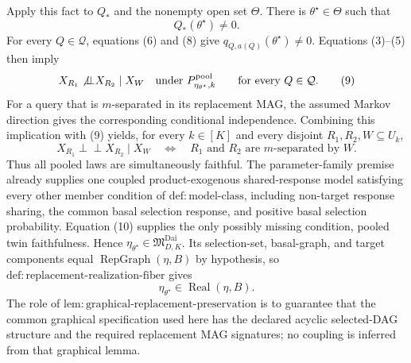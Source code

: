 Apply this fact to \(Q_*\) and the nonempty open set \(\Theta\). There is \(\theta^\star\in\Theta\) such that
\[
 Q_*(\theta^\star)\ne0.
 \tag{8}
\]
For every \(Q\in\mathcal Q\), equations (6) and (8) give \(q_{Q,a(Q)}(\theta^\star)\ne0\). Equations (3)--(5) then imply
\[
 X_{R_1}\not\!\mathbin{\perp\!\!\!\perp}X_{R_2}\mid X_W
 \quad\text{under }P_{\eta_{\theta^\star},k}^{\mathrm{pool}}
 \qquad\text{for every }Q\in\mathcal Q.
 \tag{9}
\]
For a query that is \(m\)-separated in its replacement MAG, the assumed Markov direction gives the corresponding conditional independence. Combining this implication with (9) yields, for every \(k\in[K]\) and every disjoint \(R_1,R_2,W\subseteq U_k\),
\[
 X_{R_1}\mathbin{\perp\!\!\!\perp}X_{R_2}\mid X_W
 \quad\Longleftrightarrow\quad
 R_1\text{ and }R_2\text{ are }m\text{-separated by }W.
 \tag{10}
\]
Thus all pooled laws are simultaneously faithful. The parameter-family premise already supplies one coupled product-exogenous shared-response model satisfying every other member condition of \(\mathrm{def:model\mbox{-}class}\), including non-target response sharing, the common basal selection response, and positive basal selection probability. Equation (10) supplies the only possibly missing condition, pooled twin faithfulness. Hence \(\eta_{\theta^\star}\in\mathfrak M_{D,K}^{\mathrm{Dai}}\). Its selection-set, basal-graph, and target components equal \(\operatorname{RepGraph}(\eta,B)\) by hypothesis, so \(\mathrm{def:replacement\mbox{-}realization\mbox{-}fiber}\) gives
\[
 \eta_{\theta^\star}\in\operatorname{Real}(\eta,B).
 \tag{11}
\]
The role of \(\mathrm{lem:graphical\mbox{-}replacement\mbox{-}preservation}\) is to guarantee that the common graphical specification used here has the declared acyclic selected-DAG structure and the required replacement MAG signatures; no coupling is inferred from that graphical lemma.

